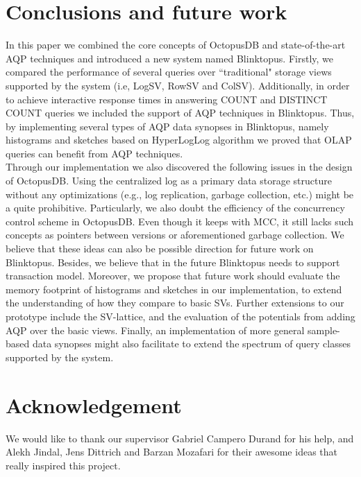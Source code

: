\documentclass[10pt, conference, compsocconf]{IEEEtran}
\begin{document}
\section{Conclusions and future work}
In this paper we combined the core concepts of OctopusDB and state-of-the-art AQP techniques and introduced a new system named Blinktopus. Firstly, we compared the performance of several queries over ``traditional" storage views supported by the system (i.e, LogSV, RowSV and ColSV). Additionally, in order to achieve interactive response times in answering COUNT and DISTINCT COUNT queries we included the support of AQP techniques in Blinktopus. Thus, by implementing several types of AQP data synopses in Blinktopus, namely histograms and sketches based on HyperLogLog algorithm we proved that OLAP queries can benefit from AQP techniques. \\
Through our implementation we also discovered the following issues in the design of OctopusDB. Using the centralized log as a primary data storage structure without any optimizations (e.g., log replication, garbage collection, etc.) might be a quite prohibitive. Particularly, we also doubt the efficiency of the concurrency control scheme in OctopusDB. Even though it keeps with MCC, it still lacks such concepts as pointers between versions or aforementioned garbage collection. We believe that these ideas can also be possible direction for future work on Blinktopus. Besides, we believe that in the future Blinktopus needs to support transaction model. Moreover, we propose that future work should evaluate the memory footprint of histograms and sketches in our implementation, to extend the understanding of how they compare to basic SVs. Further extensions to our prototype include the SV-lattice, and the evaluation of the potentials from adding AQP over the basic views. Finally, an implementation of more general sample-based data synopses might also facilitate to extend the spectrum of query classes supported by the system.

\section*{Acknowledgement}
We would like to thank our supervisor Gabriel Campero Durand for his help, and Alekh Jindal, Jens Dittrich and Barzan Mozafari for their awesome ideas that really inspired this project.
\end{document}
